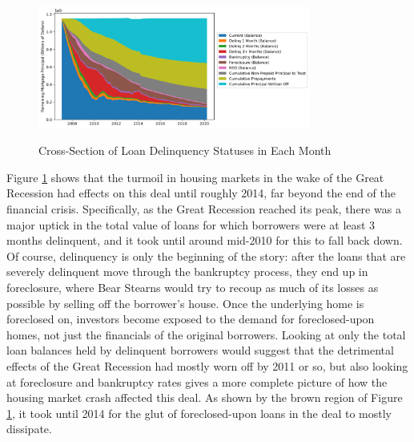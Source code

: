 \documentclass[12pt]{article}
\begin{document}
\begin{figure}[h]
	\centering
	\caption{Cross-Section of Loan Delinquency Statuses in Each Month}
	\includegraphics[width=0.8\textwidth]{../figures/stackplot_delinq_status_with_writeoffs}
	\label{fig:stackplot_delinq_status_with_writeoffs}
\end{figure}

Figure \ref{fig:stackplot_delinq_status_with_writeoffs} shows that the turmoil in housing markets in the wake of the Great Recession had effects on this deal until roughly 2014, far beyond the end of the financial crisis. Specifically, as the Great Recession reached its peak, there was a major uptick in the total value of loans for which borrowers were at least 3 months delinquent, and it took until around mid-2010 for this to fall back down. Of course, delinquency is only the beginning of the story: after the loans that are severely delinquent move through the bankruptcy process, they end up in foreclosure, where Bear Stearns would try to recoup as much of its losses as possible by selling off the borrower’s house. Once the underlying home is foreclosed on, investors become exposed to the demand for foreclosed-upon homes, not just the financials of the original borrowers. Looking at only the total loan balances held by delinquent borrowers would suggest that the detrimental effects of the Great Recession had mostly worn off by 2011 or so, but also looking at foreclosure and bankruptcy rates gives a more complete picture of how the housing market crash affected this deal. As shown by the brown region of Figure \ref{fig:stackplot_delinq_status_with_writeoffs}, it took until 2014 for the glut of foreclosed-upon loans in the deal to mostly dissipate.
\end{document}
